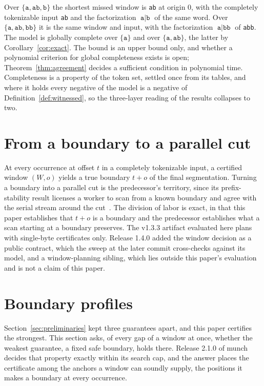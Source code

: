 \documentclass[11pt,a4paper]{article}
\theoremstyle{definition}
\theoremstyle{plain}
\newcommand{\code}[1]{\texttt{#1}}
\begin{document}
Over $\{\code{a}, \code{ab}, \code{b}\}$ the shortest missed window is \code{ab} at origin $0$, with the completely
tokenizable input \code{ab} and the factorization $\code{a} \mid \code{b}$ of the same word. Over
$\{\code{a}, \code{ab}, \code{bb}\}$ it is the same window and input, with the factorization $\code{a} \mid \code{bb}$
of \code{abb}. The model is globally complete over $\{\code{a}\}$ and over $\{\code{a}, \code{ab}\}$, the latter by
Corollary~\ref{cor:exact}. The bound is an upper bound only, and whether a polynomial criterion for global completeness
exists is open; Theorem~\ref{thm:agreement} decides a sufficient condition in polynomial time. Completeness is a
property of the token set, settled once from its tables, and where it holds every negative of the model is a negative of
Definition~\ref{def:witnessed}, so the three-layer reading of the results collapses to two.

\section{From a boundary to a parallel cut}
\label{sec:cut}

At every occurrence at offset $t$ in a completely tokenizable input, a certified window $(W, o)$ yields a true boundary
$t + o$ of the final segmentation. Turning a boundary into a parallel cut is the predecessor's territory, since its
prefix-stability result licenses a worker to scan from a known boundary and agree with the serial stream around the
cut~\cite{nidhogg2026splitpoints}. The division of labor is exact, in that this paper establishes that $t + o$ is a
boundary and the predecessor establishes what a scan starting at a boundary preserves. The v1.3.3 artifact evaluated
here plans with single-byte certificates only. Release 1.4.0 added the window decision as a public contract, which the
sweep at the later commit cross-checks against its model, and a window-planning sibling, which lies outside this paper's
evaluation and is not a claim of this paper.

\section{Boundary profiles}
\label{sec:profile}

Section~\ref{sec:preliminaries} kept three guarantees apart, and this paper certifies the strongest. This section asks,
of every gap of a window at once, whether the weakest guarantee, a fixed safe boundary, holds there. Release 2.1.0 of
munch decides that property exactly within its search cap, and the answer places the certificate among the anchors a
window can soundly supply, the positions it makes a boundary at every occurrence.
\end{document}
